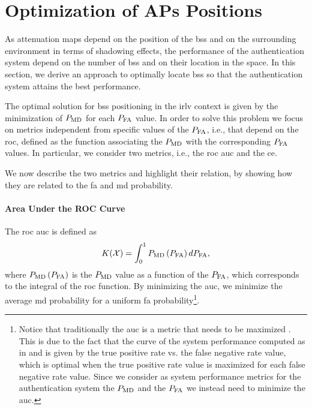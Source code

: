 \documentclass[conference]{IEEEtran}
\begin{document}


\section{Optimization of APs Positions}\label{sec:bsPos}



As attenuation maps depend on the position of the \acp{bs} and on the surrounding environment in terms of shadowing effects, the performance of the authentication system depend on the number of \acp{bs} and on their location in the space. In this section, we derive an approach to optimally locate \acp{bs} so that the authentication system attains the best performance. 

The optimal solution for \acp{bs} positioning in the \ac{irlv} context is given by the minimization of $P_{\rm MD}$ for each $P_{\rm FA}$ value. In order to solve this problem we focus on metrics independent from specific values of the $P_{\rm FA}$, i.e., that depend on the \ac{roc}, defined as the  function associating the $P_{\rm MD}$ with the corresponding $P_{\rm FA}$ values. In particular, we consider two metrics, i.e., the   \ac{roc} \ac{auc} \cite{hanley-82} and the \ac{ce}. 

We now describe the two metrics and highlight their relation, by showing how they  are related to the \ac{fa} and \ac{md} probability.

\paragraph{Area Under the ROC Curve} The \ac{roc} \ac{auc} is defined as 
\begin{equation}
    K(\mathcal{X}) = \int_{0}^{1} P_{\rm MD}\left(P_{\rm FA}\right) d P_{\rm FA},
\end{equation}
where $P_{\rm MD}\left(P_{\rm FA}\right)$ is the $P_{\rm MD}$ value as a function of the $P_{\rm FA}$, which corresponds to the integral of the \ac{roc} function. By minimizing the \ac{auc}, we minimize the average \ac{md} probability for a uniform \ac{fa} probability\footnote{Notice that traditionally the \ac{auc} is a metric that needs to be maximized \cite{hanley-82}. This is due to the fact that the curve of the system performance computed as in \cite{hanley-82} and \cite{Kennedy-11} is given by the true positive rate vs. the false negative rate value, which is optimal when the true positive rate value is maximized for each false negative rate value. Since we consider as system performance metrics for the authentication system the $P_{\rm MD}$ and the $P_{\rm FA}$ we instead need to minimize the \ac{auc}.}. 
\end{document}
